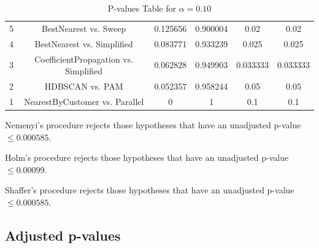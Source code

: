 \documentclass[a4paper,10pt]{article}
\begin{document}
\begin{landscape}
\begin{table}[!htp]
\begin{tabular}{cccccc}
5&BestNearest vs. Sweep&0.125656&0.900004&0.02&0.02\\
4&BestNearest vs. Simplified&0.083771&0.933239&0.025&0.025\\
3&CoefficientPropagation vs. Simplified&0.062828&0.949903&0.033333&0.033333\\
2&HDBSCAN vs. PAM&0.052357&0.958244&0.05&0.05\\
1&NearestByCustomer vs. Parallel&0&1&0.1&0.1\\
\hline
\end{tabular}
\caption{P-values Table for $\alpha=0.10$}
\end{table}Nemenyi's procedure rejects those hypotheses that have an unadjusted p-value $\le0.000585$.

Holm's procedure rejects those hypotheses that have an unadjusted p-value $\le0.00099$.

Shaffer's procedure rejects those hypotheses that have an unadjusted p-value $\le0.000585$.

\pagebreak

\subsection{Adjusted p-values}


\end{landscape}
\end{document}
